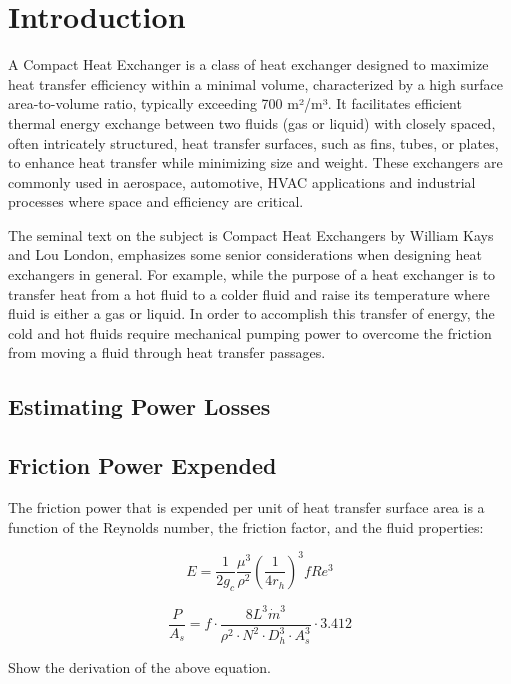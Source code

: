 \chapter{Introduction}
A Compact Heat Exchanger is a class of heat exchanger designed to maximize heat transfer efficiency within a minimal volume, characterized by a high surface area-to-volume ratio, typically exceeding 700 m²/m³. It facilitates efficient thermal energy exchange between two fluids (gas or liquid) with closely spaced, often intricately structured, heat transfer surfaces, such as fins, tubes, or plates, to enhance heat transfer while minimizing size and weight. These exchangers are commonly used in aerospace, automotive, HVAC applications and industrial processes where space and efficiency are critical.

The seminal text on the subject is Compact Heat Exchangers by William Kays and Lou London, emphasizes some senior considerations when designing heat exchangers in general. For example, while the purpose of a heat exchanger is to transfer heat from a hot fluid to a colder fluid and raise its temperature where fluid is either a gas or liquid. In order to accomplish this transfer of energy, the cold and hot fluids require mechanical pumping power to overcome the friction from moving a fluid through heat transfer passages.

\section{Estimating Power Losses}


\section{Friction Power Expended}
The friction power that is expended per unit of heat transfer surface area is a function of the Reynolds number, the friction factor, and the fluid properties:


\begin{equation}
	E=\frac{1}{2g_c} \frac{\mu^3}{\rho^2} \left(\frac{1}{4r_h}\right)^3 f Re^3
\end{equation}

\begin{equation}
	\frac{P}{A_s} = f \cdot \frac{8 L^3 \dot{m}^3}{\rho^2 \cdot N^2 \cdot D_h^3 \cdot A_s^3} \cdot 3.412 	
\end{equation}

Show the derivation of the above equation.


